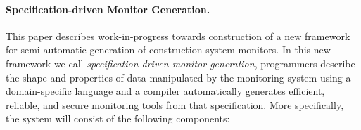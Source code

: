 \documentclass{sigplanconf}
\begin{document}


\paragraph*{Specification-driven Monitor Generation.}
This paper describes work-in-progress towards construction
of a new framework for semi-automatic generation of
construction system monitors. In this new framework
we call {\em specification-driven monitor generation}, programmers
describe the shape and properties of data manipulated by
the monitoring system using a domain-specific language and a compiler automatically
generates efficient, reliable, and secure
monitoring tools from that specification.
More specifically, the system will consist of the 
following components:
\end{document}
